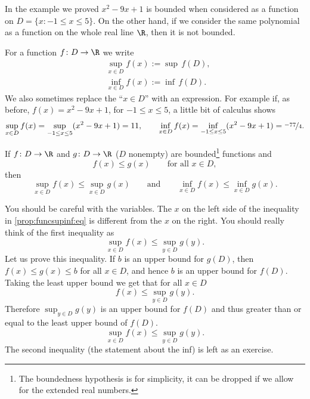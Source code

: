 \documentclass[12pt]{book}
\begin{document}
In the example we proved $x^2-9x+1$ is bounded when considered as a
function on $D = \{ x : -1 \leq x \leq 5 \}$.
 On the other hand,
if we consider the same polynomial as a function on the whole real line $\R$,
then it is not bounded.

For a function $f \colon D \to \R$ we write
\begin{align*}
& \sup_{x \in D} f(x) := \sup\, f(D) , \\
& \inf_{x \in D} f(x) := \inf\, f(D) .
\end{align*}
We also sometimes replace the ``$x \in D$'' with an expression.
For example if, as before, $f(x) = x^2-9x+1$, for $-1 \leq x \leq 5$, 
a little bit of calculus shows
\begin{equation*}
\sup_{x \in D} f(x) = 
\sup_{-1 \leq x \leq 5} ( x^2 -9x+1 ) = 11,
\qquad
\inf_{x \in D} f(x) = 
\inf_{-1 \leq x \leq 5} ( x^2 -9x+1 ) = \nicefrac{-77}{4} .
\end{equation*}




\begin{prop} \label{prop:funcsupinf}
If $f \colon D \to \R$ and $g \colon D \to \R$ ($D$ nonempty) are
bounded\footnote{The boundedness hypothesis is for simplicity,
it can be dropped if we allow for the extended real numbers.}
functions and
\begin{equation*}
f(x) \leq g(x) \qquad \text{for all $x \in D$},
\end{equation*}
then
\begin{equation} \label{prop:funcsupinf:eq}
\sup_{x \in D} f(x) \leq \sup_{x \in D} g(x)
\qquad \text{and} \qquad
\inf_{x \in D} f(x) \leq \inf_{x \in D} g(x) .
\end{equation}
\end{prop}

You should be careful with the variables.
The $x$ on the left side of
the inequality in \eqref{prop:funcsupinf:eq}
is different from the $x$ on the right.
You
should really think of the first inequality as
\begin{equation*}
\sup_{x \in D} f(x) \leq \sup_{y \in D} g(y) .
\end{equation*}
Let us prove this inequality.
If $b$ is an upper bound for $g(D)$, then
$f(x) \leq g(x) \leq b$ for all $x \in D$, and hence $b$ is an upper bound for $f(D)$.
Taking the least upper bound we get that for all $x \in D$
\begin{equation*}
f(x) \leq \sup_{y \in D} g(y) .
\end{equation*}
Therefore
$\sup_{y \in D} g(y)$ is an upper bound for $f(D)$ and thus greater than or
equal to the least upper bound of $f(D)$.
\begin{equation*}
\sup_{x \in D} f(x) \leq \sup_{y \in D} g(y) .
\end{equation*}
The second inequality (the statement about the inf) is left as an exercise.
\end{document}
